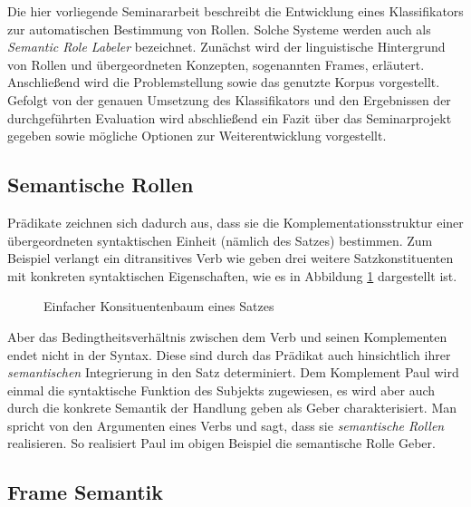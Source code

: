 \documentclass[12pt]{article}
\begin{document}
Die hier vorliegende Seminararbeit beschreibt die Entwicklung eines Klassifikators zur automatischen Bestimmung von Rollen. Solche Systeme werden auch als \textit{Semantic Role Labeler} bezeichnet.  Zunächst wird der linguistische Hintergrund von Rollen und übergeordneten Konzepten, sogenannten Frames, erläutert. Anschließend wird die Problemstellung sowie das genutzte Korpus vorgestellt. Gefolgt von der genauen Umsetzung des Klassifikators und den Ergebnissen der durchgeführten Evaluation wird abschließend ein Fazit über das Seminarprojekt gegeben sowie mögliche Optionen zur Weiterentwicklung vorgestellt. 

\subsection{Semantische Rollen}

Prädikate zeichnen sich dadurch aus, dass sie die Komplementationsstruktur einer
übergeordneten syntaktischen Einheit (nämlich des Satzes) bestimmen. Zum
Beispiel verlangt ein ditransitives Verb wie \glqq{}geben\grqq{} drei weitere Satzkonstituenten mit konkreten syntaktischen Eigenschaften, wie es in Abbildung \ref{Konstituentenbaum} dargestellt ist.

\begin{figure}
	\centering
	\caption[Einfacher Konsituentenbaum eines Satzes]{Einfacher Konsituentenbaum eines Satzes}
	\label{Konstituentenbaum}
\end{figure}

Aber das Bedingtheitsverhältnis zwischen dem Verb und seinen Komplementen 
endet nicht in der Syntax. Diese sind durch das Prädikat auch hinsichtlich ihrer 
\textit{semantischen} Integrierung in den Satz determiniert. Dem Komplement \glqq{}Paul\grqq{}
wird einmal die syntaktische Funktion des Subjekts zugewiesen, es wird aber auch
durch die konkrete Semantik der Handlung \glqq{}geben\grqq{} als 
\glqq{}Geber\grqq{} charakterisiert. Man spricht von den Argumenten
eines Verbs und sagt, dass sie \textit{semantische Rollen} realisieren. So realisiert \glqq{}Paul\grqq{} im obigen Beispiel die semantische Rolle \glqq{}Geber\grqq{}.

\subsection{Frame Semantik}
\end{document}
